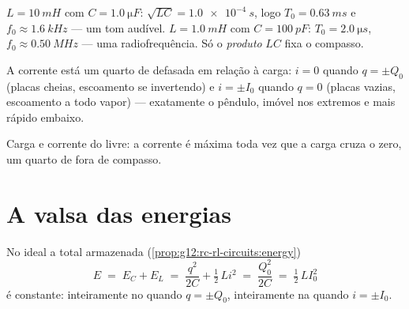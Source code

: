 \begin{example}\label{ex:g12:rlc-oscillations:firstnumbers}
$L = \qty{10}{mH}$ com $C = \qty{1.0}{\micro F}$: $\sqrt{LC} = \qty{1.0e-4}{s}$, logo
$T_0 = \qty{0.63}{ms}$ e $f_0 \approx \qty{1.6}{kHz}$ --- um tom audível.
$L = \qty{1.0}{mH}$ com $C = \qty{100}{pF}$: $T_0 = \qty{2.0}{\micro s}$,
$f_0 \approx \qty{0.50}{MHz}$ --- uma radiofrequência. Só o \emph{produto} $LC$ fixa o
compasso.
\end{example}

\begin{remark}\label{rem:g12:rlc-oscillations:quarter}
A corrente está um quarto de  defasada em relação à carga: $i = 0$ quando
$q = \pm Q_0$ (placas cheias, escoamento se invertendo) e $i = \pm I_0$ quando $q = 0$
(placas vazias, escoamento a todo vapor) --- exatamente o pêndulo, imóvel nos extremos e
mais rápido embaixo.
\end{remark}

\begin{omfigure}

{\small Carga e corrente do  livre: a corrente é máxima toda vez que a carga
cruza o zero, um quarto de  fora de compasso.}
\end{omfigure}

\section{A valsa das energias}

\begin{proposition}\label{prop:g12:rlc-oscillations:energy}
No  ideal a  total armazenada
(\cref{prop:g12:rc-rl-circuits:energy})
\[
E \;=\; E_C + E_L \;=\; \frac{q^2}{2C} + \tfrac12\,L i^2
\;=\; \frac{Q_0^2}{2C} \;=\; \tfrac12\,L I_0^2
\]
é constante: inteiramente no  quando $q = \pm Q_0$, inteiramente na 
quando $i = \pm I_0$.
\end{proposition}

